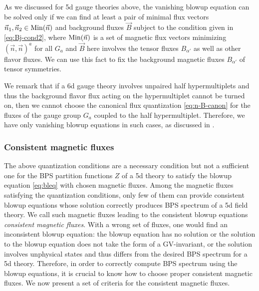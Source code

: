 As we discussed for 5d gauge theories above, the vanishing blowup equation can be solved only if we can find at least a pair of minimal flux vectors $\vec{n}_1,\vec{n}_2\in {\rm Min}(\vec{n})$ and background fluxes $\vec{B}$ subject to the condition given in \eqref{eq:Bj-cond2}, where ${\rm Min}(\vec{n})$ is a set of magnetic flux vectors minimizing $(\vec{n},\vec{n})^a$ for all $G_a$ and $\vec{B}$ here involves the tensor fluxes $B_{\alpha'}$ as well as other flavor fluxes. We can use this fact to fix the background magnetic fluxes $B_{\alpha'}$ of tensor symmetries.

We remark that if a 6d gauge theory involves unpaired half hypermultiplets and thus the background flavor flux acting on the hypermultiplet cannot be turned on, then we cannot choose the canonical flux quantization \eqref{eq:n-B-canon} for the fluxes of the gauge group $G_a$ coupled to the half hypermultiplet. Therefore, we have only vanishing blowup equations in such cases, as discussed in \cite{Gu:2020fem}.


\subsubsection{Consistent magnetic fluxes}

The above quantization conditions are a necessary condition but not a sufficient one for the BPS partition functions $Z$ of a 5d theory to satisfy the blowup equation \eqref{eq:bleq} with chosen magnetic fluxes. Among the magnetic fluxes satisfying the quantization conditions, only few of them can provide consistent blowup equations whose solution correctly produces BPS spectrum of a 5d field theory. We call such magnetic fluxes leading to the consistent blowup equations {\it consistent magnetic fluxes}. With a wrong set of fluxes, one would find an inconsistent blowup equation: the blowup equation has no solution or the solution to the blowup equation does not take the form of a GV-invariant, or the solution involves unphysical states and thus differs from the desired BPS spectrum for a 5d theory. Therefore, in order to correctly compute BPS spectrum using the blowup equations, it is crucial to know how to choose proper consistent magnetic fluxes. We now present a set of criteria for the consistent magnetic fluxes.

